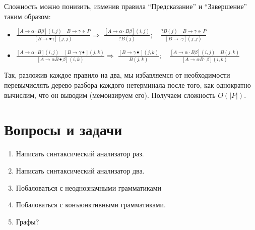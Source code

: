 Сложность можно понизить, изменив правила ``Предсказание'' и ``Завершение'' таким образом:
\begin{itemize}
	\item $\frac{[A \rightarrow \alpha \cdot B \beta](i, j) \quad B \rightarrow \gamma \in P}{[B \rightarrow \bullet \gamma](j, j)} \Rightarrow$ $
	\frac{[A \rightarrow \alpha \cdot B \beta](i, j)}{? B(j)}; \quad \frac{? B(j) \quad B \rightarrow \gamma \in P}{[B \rightarrow \cdot \gamma](j, j)}$
	\item $\frac{[A \rightarrow \alpha \cdot B](i, j) \quad[B \rightarrow \gamma \bullet](j, k)}{[A \rightarrow \alpha B \bullet \beta](i, k)} \Rightarrow$ $\frac{[B \rightarrow \gamma \bullet](j, k)}{B(j, k)}; \quad \frac{[A \rightarrow \alpha \cdot B \beta](i, j) \quad B(j, k)}{[A \rightarrow \alpha B \cdot \beta](i, k)}$
\end{itemize}
Так, разложив каждое правило на два, мы избавляемся от необходимости перевычислять дерево разбора каждого нетерминала после того, как однократно вычислим, что он выводим (мемоизируем его). Получаем сложность $O(|P|)$.




\section{Вопросы и задачи}
\begin{enumerate}
  \item Написать синтаксический анализатор раз.
  \item Написать синтаксический анализатор два.
  \item Побаловаться с неоднозначными грамматиками
  \item Побаловаться с конъюнктивными грамматиками.
  \item Графы?
\end{enumerate}

